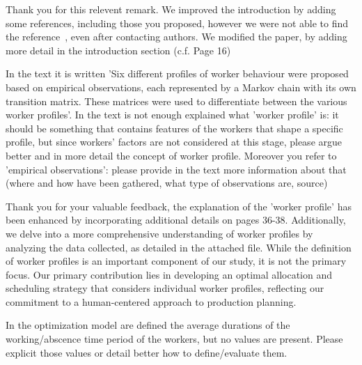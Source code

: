 \documentclass[preprint,11pt,3p]{elsarticle}
\begin{document}
\begin{tcolorbox}[colback=r_color1,colframe=r_color2,title=Response Q1   :]

 Thank you for this relevent remark. We improved the introduction by adding some references, including those you proposed, however we were not able to find the reference~\cite{nagata2023proposal}, even after contacting authors. We modified the paper, by adding more detail in the introduction section (c.f. Page 16)
		
\end{tcolorbox}

\begin{tcolorbox}[colback=q_color1,colframe=q_color2,title=Q2:]
In the text it is written 'Six different profiles of worker behaviour were proposed based on empirical observations, each represented by a Markov chain with its own transition matrix. These matrices were used to differentiate between the various worker profiles'. In the text is not enough explained what 'worker profile' is: it should be something that contains features of the workers that shape a specific profile, but since workers' factors are not considered at this stage, please argue better and in more detail the concept of worker profile. Moreover you refer to 'empirical observations': please provide in the text more information about that (where and how have been gathered, what type of observations are, source)
\end{tcolorbox}


\begin{tcolorbox}[colback=r_color1,colframe=r_color2,title=Response Q2:]
    Thank you for your valuable feedback, the explanation of the 'worker profile' has been enhanced by incorporating additional details on pages 36-38. Additionally, we delve into a more comprehensive understanding of worker profiles by analyzing the data collected, as detailed in the attached file. While the definition of worker profiles is an important component of our study, it is not the primary focus. Our primary contribution lies in developing an optimal allocation and scheduling strategy that considers individual worker profiles, reflecting our commitment to a human-centered approach to production planning. 
    


    
\end{tcolorbox}
\begin{tcolorbox}[colback=q_color1,colframe=q_color2,title=Q3:]
In the optimization model are defined the average durations of the working/abscence time period of the workers, but no values are present. Please explicit those values or detail better how to define/evaluate them.
			
\end{tcolorbox}
\end{document}
